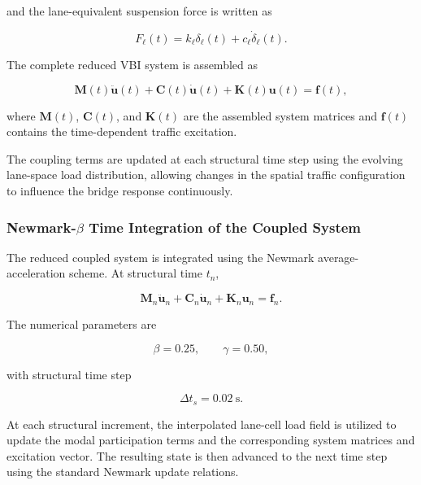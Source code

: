\documentclass[journal]{IEEEtran}
\begin{document}
and the lane-equivalent
suspension force is written as

\begin{equation}
F_{\ell}(t)
=
k_{\ell}\delta_{\ell}(t)
+
c_{\ell}\dot{\delta}_{\ell}(t).
\end{equation}

The complete reduced
VBI system is assembled as

\begin{equation}
\mathbf{M}(t)\ddot{\mathbf{u}}(t)
+
\mathbf{C}(t)\dot{\mathbf{u}}(t)
+
\mathbf{K}(t)\mathbf{u}(t)
=
\mathbf{f}(t),
\end{equation}

where $\mathbf{M}(t)$, $\mathbf{C}(t)$, and $\mathbf{K}(t)$ are the assembled
system matrices and $\mathbf{f}(t)$ contains the
time-dependent traffic excitation.

The coupling terms are updated at each structural time step using the evolving lane-space load distribution, allowing changes in the spatial traffic configuration to influence the bridge response continuously.

\subsubsection{Newmark-$\beta$ Time Integration of the Coupled System}

The reduced coupled
system is integrated using the Newmark average-acceleration scheme. At
structural time $t_n$,

\begin{equation}
\mathbf{M}_n\ddot{\mathbf{u}}_n
+
\mathbf{C}_n\dot{\mathbf{u}}_n
+
\mathbf{K}_n\mathbf{u}_n
=
\mathbf{f}_n.
\end{equation}

The numerical
parameters are

\begin{equation}
\beta = 0.25,
\qquad
\gamma = 0.50,
\end{equation}

with structural time
step

\begin{equation}
\Delta t_s = 0.02~\mathrm{s}.
\end{equation}

At each structural
increment, the interpolated lane-cell load field is utilized to update the
modal participation terms and the corresponding system matrices and excitation
vector. The resulting state is then advanced to the next time step using the
standard Newmark update relations.
\end{document}
